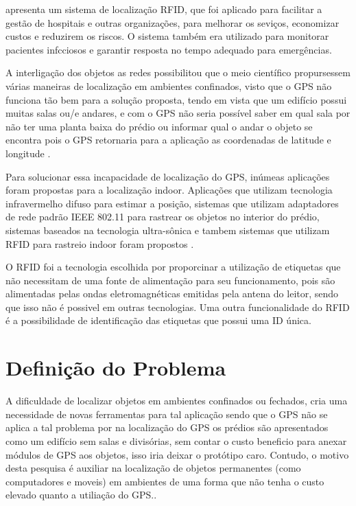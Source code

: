 \citeauthor{landmarc} apresenta um sistema de localização RFID, que foi aplicado para facilitar a gestão de hospitais e outras organizações, para melhorar os seviços, economizar custos e reduzirem os riscos. O sistema também era utilizado para monitorar pacientes infcciosos e garantir resposta no tempo adequado para emergências.


A interligação dos objetos as redes possibilitou que o meio científico propursessem várias maneiras de localização em ambientes 
confinados, visto que o GPS não funciona tão bem para a solução proposta, tendo em vista que um edifício possui muitas salas ou/e andares, e com o GPS não seria possível saber em qual sala por não ter uma planta baixa do prédio ou informar qual o andar o objeto se encontra pois o GPS retornaria para a aplicação as coordenadas de latitude e longitude \cite{rfid2009review}.


Para solucionar essa incapacidade de localização do GPS, inúmeas aplicações foram propostas para a localização indoor.  Aplicações que utilizam tecnologia infravermelho difuso para estimar a posição, sistemas que utilizam adaptadores de rede padrão IEEE 802.11 para rastrear os objetos no interior do prédio, sistemas baseados na tecnologia ultra-sônica e tambem sistemas que utilizam RFID para rastreio indoor foram propostos \cite{mechanismRFID2006}. 


O RFID foi a tecnologia escolhida por proporcinar a utilização de etiquetas que não necessitam de uma fonte de alimentação para seu funcionamento, pois são alimentadas pelas ondas eletromagnéticas emitidas pela antena do leitor, sendo que isso não é possivel em outras tecnologias. Uma outra funcionalidade do RFID é a possibilidade de identificação das etiquetas que possui uma ID única.



\section{Definição do Problema}
A dificuldade de localizar objetos em ambientes confinados ou fechados, cria uma necessidade de novas ferramentas para 
tal aplicação sendo que o GPS não se aplica a tal problema por na localização do GPS os prédios são apresentados como um edifício sem salas e divisórias, sem contar o custo beneficio para anexar módulos de GPS aos objetos, isso iria deixar o protótipo caro. Contudo, o motivo desta pesquisa é auxiliar na localização de objetos permanentes (como computadores e moveis) 
em ambientes de uma forma que não tenha o custo elevado quanto a utiliação do GPS.\cite{mechanismRFID2006}.

